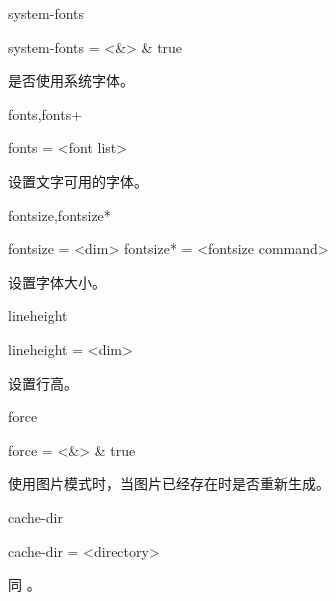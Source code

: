 \documentclass[class=article,openany]{cusdoc}[2025/10/10]
\begin{document}
\begin{keyval}[path=layout]{system-fonts}
  \begin{syntax}
    system-fonts = <&\TTF> & true
  \end{syntax}
是否使用系统字体。
\end{keyval}

\begin{keyval}[path=layout]{fonts,fonts+}
  \begin{syntax}
    fonts = <{font list}>
  \end{syntax}
设置文字可用的字体。
\end{keyval}

\begin{keyval}[path=layout]{fontsize,fontsize*}
  \begin{syntax}
    fontsize  = <{dim}>
    fontsize* = <{fontsize command}>
  \end{syntax}
设置字体大小。
\end{keyval}

\begin{keyval}[path=layout]{lineheight}
  \begin{syntax}
    lineheight = <{dim}>
  \end{syntax}
设置行高。
\end{keyval}

\begin{keyval}[path=layout]{force}
  \begin{syntax}
    force = <&\TTF> & true
  \end{syntax}
使用图片模式时，当图片已经存在时是否重新生成。
\end{keyval}

\begin{keyval}[path=layout]{cache-dir}
  \begin{syntax}
    cache-dir = <{directory}>
  \end{syntax}
同 。
\end{keyval}


\printbibliography[heading=titleed]

\printindex[docchange]

\vspace{15pt}

\printindex[docusage]
\end{document}
